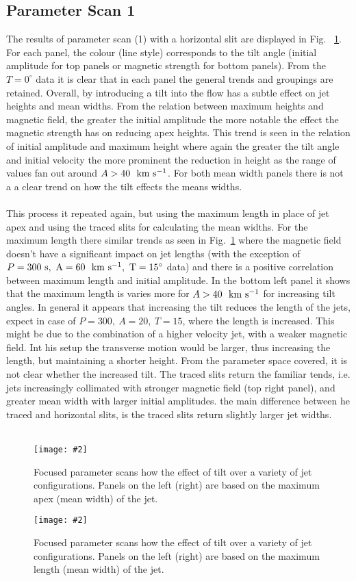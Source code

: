 \documentclass[12pt]{ociamthesis}
\newcommand{\mfig}[4]{
  \begin{figure}
  \begin{center}
  \texttt{[image: \#2]}
  \caption{#3}
  \label{#4}
  \end{center}
  \end{figure}}
\newcommand{\kms}{~\rm{km ~s^{-1}}}
\newcommand{\np}{\\ \\}
\begin{document}
\subsection{Parameter Scan 1}
\label{subsec:pscansII_I}
The results of parameter scan (1) with a horizontal slit are displayed in Fig. ~\ref{p_scan_t_apex}. For each panel, the colour (line style) corresponds to the tilt angle (initial amplitude for top panels or magnetic strength for bottom panels). From the $T=0^{\circ}$ data it is clear that in each panel the general trends and groupings are retained. Overall, by introducing a tilt into the flow has a subtle effect on jet heights and mean widths. From the relation between maximum heights and magnetic field, the greater the initial amplitude the more notable the effect the magnetic strength has on reducing apex heights. This trend is seen in the relation of initial amplitude and maximum height where again the greater the tilt angle and initial velocity the more prominent the reduction in height as the range of values fan out around $A>40~\kms$. For both mean width panels there is not a a clear trend on how the tilt effects the means widths. \np
%
This process it repeated again, but using the maximum length in place of jet apex and using the traced slits for calculating the mean widths. For the maximum length there similar trends as seen in Fig.~\ref{p_scan_t_apex} where the magnetic field doesn't have a significant impact on jet lengths (with the exception of $P=300~\rm{s},~A=60~\kms,~T=15^{\circ}$ data) and there is a positive correlation between maximum length and initial amplitude. In the bottom left panel it shows that the maximum length is varies more for $A>40~\kms$ for increasing tilt angles. In general it appears that increasing the tilt reduces the length of the jets, expect in case of $P=300,~A=20,~T=15$, where the length is increased. This might be due to the combination of a higher velocity jet, with a weaker magnetic field. Int his setup the transverse motion would be larger, thus increasing the length, but maintaining a shorter height. From the parameter space covered, it is not clear whether the increased tilt. The traced slits return the familiar tends, i.e. jets increasingly collimated with stronger magnetic field (top right panel), and greater mean width with larger initial amplitudes. the main difference between he traced and horizontal slits, is the traced slits return slightly larger jet widths.  \np
\mfig{1}{figures/horizontal_slit_pscan_fixing.png}{Focused parameter scans how the effect of tilt over a variety of jet configurations. Panels on the left (right) are based on the maximum apex (mean width) of the jet.}{p_scan_t_apex}
%
\mfig{1}{figures/traced_slit_pscan_fixing.png}{Focused parameter scans how the effect of tilt over a variety of jet configurations. Panels on the left (right) are based on the maximum length (mean width) of the jet.}{p_scan_t_len}
%
\end{document}
